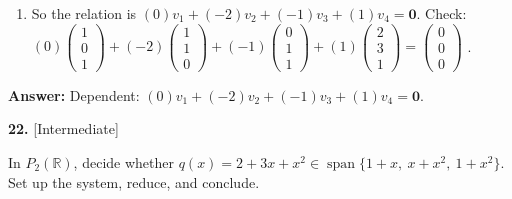 \documentclass[11pt]{article}
\begin{document}
\begin{tcolorbox}[breakable,colback=ans,colframe=ansb,boxrule=0.5pt,left=4pt,right=4pt,top=2pt,bottom=2pt]
\begin{enumerate}[leftmargin=2.2em,itemsep=1pt,topsep=1pt,label=\textbf{Step \arabic*.}]
\item So the relation is $(0)v_1+(-2)v_2+(-1)v_3+(1)v_4=\mathbf 0$. Check: $(0)\begin{pmatrix}1\\0\\1\end{pmatrix}+(-2)\begin{pmatrix}1\\1\\0\end{pmatrix}+(-1)\begin{pmatrix}0\\1\\1\end{pmatrix}+(1)\begin{pmatrix}2\\3\\1\end{pmatrix}=\begin{pmatrix}0\\0\\0\end{pmatrix}$ \checkmark.
\end{enumerate}\textbf{Answer:} Dependent: $(0)v_1+(-2)v_2+(-1)v_3+(1)v_4=\mathbf 0$.\end{tcolorbox}
\par\vspace{2pt}
\begin{minipage}{\linewidth}\textbf{22.} \hfill{\scriptsize\color{ink}[Intermediate]}\par\nopagebreak In $P_{2}(\mathbb{R})$, decide whether $q(x)=2+3x+x^{2}\in\operatorname{span}\{1+x,\ x+x^{2},\ 1+x^{2}\}$. Set up the system, reduce, and conclude.
\end{minipage}\par\nopagebreak
\end{document}
